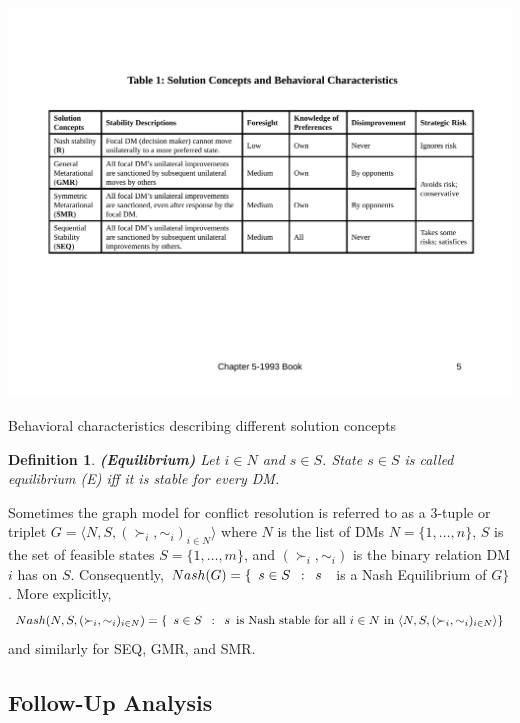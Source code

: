 \documentclass[letterpaper,12pt,titlepage,oneside,final]{book}
\newtheorem{definition}[lemma]{Definition}
\begin{document}
\begin{table}[H]
\centering
\includegraphics[scale=.75]{PDF-IMG/tablecomp.pdf}

\caption{Behavioral characteristics describing different solution concepts}

\label{tbl:behchar}
\end{table}

\begin{definition}
\rm {\bf (Equilibrium)}  Let $i \in N$ and $s \in
S$. State $s \in S$ is called \emph{equilibrium} (\emph{E}) \emph{iff} it is stable for every DM.
\end{definition}

Sometimes the graph model for conflict resolution is referred to as a 3-tuple or triplet $G=\langle N,S,(\succ_i,\sim_i)_{i\in N}\rangle$ where $N$ is the list of DMs $N=\{1,\dots ,n\}$, $S$ is the set of feasible states $S=\{1,\dots ,m\}$, and $(\succ_i,\sim_i)$ is the binary relation DM $i$ has on $S$. Consequently, $Nash(G)=\{ \enskip s \in S \enskip : \enskip s \enskip$  is a Nash Equilibrium of $G \}$. More explicitly, $$Nash(N,S,(\succ_i,\sim_i)_{i\in N})=\{ \enskip s \in S \enskip : \enskip s \enskip  \text{is Nash stable for all } i \in N \text{ in } \langle N,S,(\succ_i,\sim_i)_{i\in N}\rangle \}$$ and similarly for SEQ, GMR, and SMR.


\subsection{Follow-Up Analysis}
\end{document}
